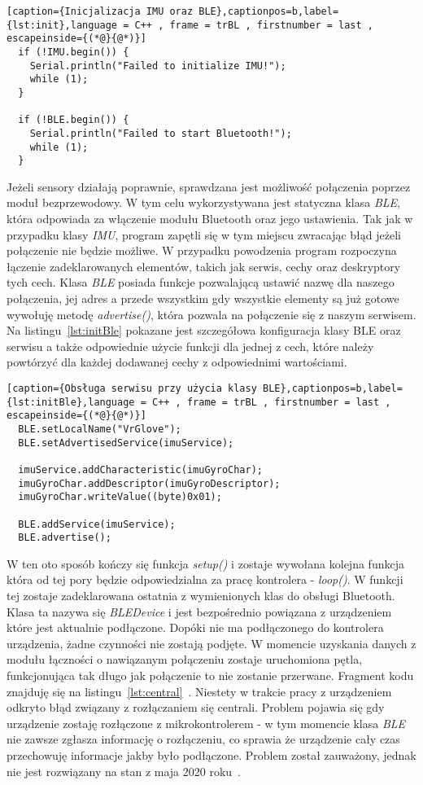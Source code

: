 \begin{lstlisting}[caption={Inicjalizacja IMU oraz BLE},captionpos=b,label={lst:init},language = C++ , frame = trBL , firstnumber = last , escapeinside={(*@}{@*)}]
  if (!IMU.begin()) {
    Serial.println("Failed to initialize IMU!");
    while (1);
  }

  if (!BLE.begin()) {
    Serial.println("Failed to start Bluetooth!");
    while (1);
  }
\end{lstlisting}
Jeżeli sensory działają poprawnie, sprawdzana jest możliwość połączenia poprzez moduł bezprzewodowy. W tym celu wykorzystywana jest statyczna klasa \textit{BLE}, która odpowiada za włączenie modułu Bluetooth oraz jego ustawienia. Tak jak w przypadku klasy \textit{IMU}, program zapętli się w tym miejscu zwracając błąd jeżeli połączenie nie będzie możliwe. W przypadku powodzenia program rozpoczyna łączenie zadeklarowanych elementów, takich jak serwis, cechy oraz deskryptory tych cech. Klasa \textit{BLE} posiada funkcje pozwalającą ustawić nazwę dla naszego połączenia, jej adres a przede wszystkim gdy wszystkie elementy są już gotowe wywołuję metodę \textit{advertise()}, która pozwala na połączenie się z naszym serwisem. Na listingu~\ref{lst:initBle} pokazane jest szczegółowa konfiguracja klasy BLE oraz serwisu a także odpowiednie użycie funkcji dla jednej z cech, które należy powtórzyć dla każdej dodawanej cechy z odpowiednimi wartościami.
\begin{lstlisting}[caption={Obsługa serwisu przy użycia klasy BLE},captionpos=b,label={lst:initBle},language = C++ , frame = trBL , firstnumber = last , escapeinside={(*@}{@*)}]
  BLE.setLocalName("VrGlove");  
  BLE.setAdvertisedService(imuService);

  imuService.addCharacteristic(imuGyroChar);
  imuGyroChar.addDescriptor(imuGyroDescriptor);
  imuGyroChar.writeValue((byte)0x01);
  
  BLE.addService(imuService);     
  BLE.advertise();
\end{lstlisting}
W ten oto sposób kończy się funkcja \textit{setup()} i zostaje wywołana kolejna funkcja która od tej pory będzie odpowiedzialna za pracę kontrolera - \textit{loop()}. W funkcji tej zostaje zadeklarowana ostatnia z wymienionych klas do obsługi Bluetooth. Klasa ta nazywa się \textit{BLEDevice} i jest bezpośrednio powiązana z urządzeniem które jest aktualnie podłączone. Dopóki nie ma podłączonego do kontrolera urządzenia, żadne czynności nie zostają podjęte. W momencie uzyskania danych z modułu łączności o nawiązanym połączeniu zostaje uruchomiona pętla, funkcjonująca tak długo jak połączenie to nie zostanie przerwane. Fragment kodu znajduję się na listingu~\ref{lst:central}~\cite{ArduinoBLE}. Niestety w trakcie pracy z urządzeniem odkryto błąd związany z rozłączaniem się centrali. Problem pojawia się gdy urządzenie zostaję rozłączone z mikrokontrolerem - w tym momencie klasa \textit{BLE} nie zawsze zgłasza informację o rozłączeniu, co sprawia że urządzenie cały czas przechowuję informacje jakby było podłączone. Problem został zauważony, jednak nie jest rozwiązany na stan z maja 2020 roku~\cite{ArduinoBug}. 

